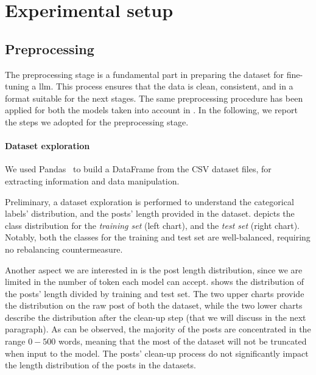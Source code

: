 \documentclass[11pt]{article}
\begin{document}
\section{Experimental setup}\label{sec:experimental-setup}

\subsection{Preprocessing}\label{sec:preprocessing}
The preprocessing stage is a fundamental part in preparing the dataset for fine-tuning a \ac{llm}.
%
This process ensures that the data is clean, consistent, and in a format suitable for the next stages.
%
The same preprocessing procedure has been applied for both the models taken into account in .
%
In the following,
we report the steps we adopted for the preprocessing stage.

\paragraph{Dataset exploration}
We used Pandas~\cite{reback2020pandas} to build a DataFrame from the CSV dataset files,
for extracting information and data manipulation.

Preliminary,
a dataset exploration is performed to understand the categorical labels' distribution,
and the posts' length provided in the dataset.
%
 depicts the class distribution for the \emph{training set} (left chart),
and the \emph{test set} (right chart).
%
Notably,
both the classes for the training and test set are well-balanced,
requiring no rebalancing countermeasure.

Another aspect we are interested in is the post length distribution,
since we are limited in the number of token each model can accept.
%
 shows the distribution of the posts' length divided by training and test set.
%
The two upper charts provide the distribution on the raw post of both the dataset,
while the two lower charts describe the distribution after the clean-up step (that we will discuss in the next paragraph).
%
As can be observed,
the majority of the posts are concentrated in the range $0-500$ words,
meaning that the most of the dataset will not be truncated when input to the model.
%
The posts' clean-up process do not significantly impact the length distribution of the posts in the datasets.
\end{document}
